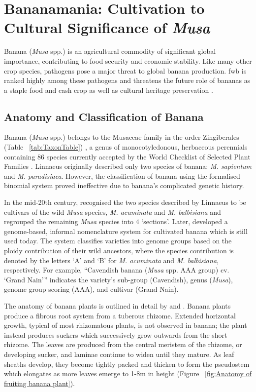 \section{Bananamania: Cultivation to Cultural Significance of \textit{Musa}}

Banana (\textit{Musa} spp.) is an agricultural commodity of significant global importance, contributing to food security and economic stability. Like many other crop species, pathogens pose a major threat to global banana production. \ac{fwb} is ranked highly among these pathogens and threatens the future role of bananas as a staple food and cash crop as well as cultural heritage preservation \parencite{Kema2021}. 

\subsection{Anatomy and Classification of Banana}  

Banana (\textit{Musa} spp.) belongs to the Musaceae family in the order Zingiberales (Table ~\ref{tab:TaxonTable}) \parencite{Schoch2020}, a genus of monocotyledonous, herbaceous perennials containing 86 species currently accepted by the World Checklist of Selected Plant Families \parencite{WCSPF2023}. Linnaeus originally described only two species of banana: \textit{M. sapientum }and \textit{M. paradisiaca}. However, the classification of banana using the formalised binomial system proved ineffective due to banana’s complicated genetic history.

In the mid-20th century, \textcite{Cheesman1947} recognised the two species described by Linnaeus to be cultivars of the wild \textit{Musa} species, \textit{M. acuminata }and \textit{M. balbisiana} and regrouped the remaining \textit{Musa} species into 4 ‘sections’. Later, \textcite{Simmonds1955} developed a genome-based, informal nomenclature system for cultivated banana which is still used today. The system classifies varieties into genome groups based on the ploidy contribution of their wild ancestors, where the species contribution is denoted by the letters ‘A’ and ‘B’ for \textit{M. acuminata} and \textit{M. balbisiana}, respectively. For example, “Cavendish banana (\textit{Musa } spp. AAA group) cv. ‘Grand Nain’” indicates the variety’s sub-group (Cavendish), genus (\textit{Musa}), genome group scoring (AAA), and cultivar (Grand Nain).

The anatomy of banana plants is outlined in detail by \textcite{Bakry2009} and \textcite{Robinson2010}. Banana plants produce a fibrous root system from a tuberous rhizome. Extended horizontal growth, typical of most rhizomatous plants, is not observed in banana; the plant instead produces suckers which successively grow outwards from the short rhizome. The leaves are produced from the central meristem of the rhizome, or developing sucker, and laminae continue to widen until they mature. As leaf sheaths develop, they become tightly packed and thicken to form the pseudostem which elongates as more leaves emerge to 1-8m in height (Figure ~\ref{fig:Anatomy of fruiting banana plant}). 

